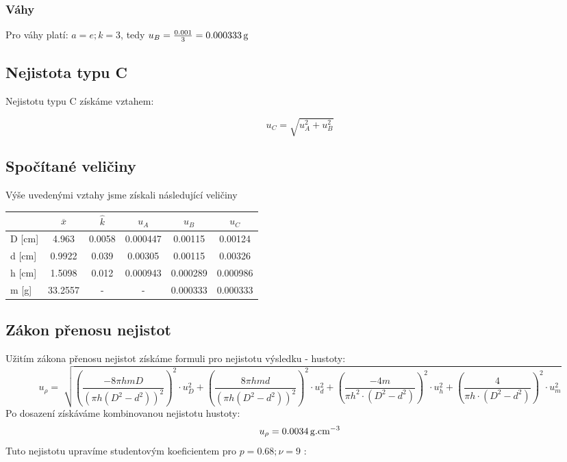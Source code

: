 \documentclass[czech,11pt,a4paper]{article}
\begin{document}
	\subsubsection{Váhy}
	Pro váhy platí: $a=e; k =3$, tedy $ u_B = \frac{0.001}{3} = 0.000333\,\rm g$
	
	\subsection{Nejistota typu C}
	Nejistotu typu C získáme vztahem:
	
	\begin{equation}
		u_C = \sqrt{u_A ^2 + u_B ^2}
	\end{equation}
	
	\subsection{Spočítané veličiny}
	Výše uvedenými vztahy jsme získali následující veličiny \\
	
	\quad \quad \quad \quad \quad \quad \quad   \begin{tabular}{||l|c|c|c|c|c||}
		\hline
		& $\overline{x}$ & $\hat{k}$ & $u_A$ & $u_B$ & $u_C$   \\
		\hline
		D [cm]& 4.963 & 0.0058 & 0.000447 & 0.00115 & 0.00124   \\
		\hline
		d [cm]& 0.9922 & 0.039 & 0.00305 & 0.00115 & 0.00326   \\
		\hline
		h [cm]& 1.5098 & 0.012 & 0.000943 & 0.000289 & 0.000986   \\
		\hline
		m [g]& 33.2557 & - & - & 0.000333 & 0.000333   \\
		\hline
	\end{tabular}
	
	
	\subsection{Zákon přenosu nejistot}
	
	
	Užitím zákona přenosu nejistot získáme formuli pro nejistotu výsledku - hustoty:
	{\tiny
	\begin{equation}
		u_{\rho} = \sqrt[]{
			\left(\frac{-8 \pi h m D}{\left(\pi h\left(D^2-d^2\right)\right)^2}\right)^2 \cdot u_D^2 +
			\left(\frac{8 \pi h m d}{\left(\pi h\left(D^2-d^2\right)\right)^2}\right)^2 \cdot u_d^2  +
			\left(\frac{-4 m}{\pi h^2 \cdot\left(D^2-d^2\right)}\right)^2 
			\cdot u_h^2 +
			\left(\frac{4 }{\pi h \cdot\left(D^2-d^2\right)}\right)^2 \cdot u_m^2 }
 	\end{equation}
}
	Po dosazení získáváme kombinovanou nejistotu hustoty:
	\begin{equation*}
		u_\rho = 0.0034 \,\rm g .cm^{-3}
	\end{equation*}
	Tuto nejistotu upravíme studentovým koeficientem pro $ p = 0.68 ; \nu = 9$ :
	
\end{document}
